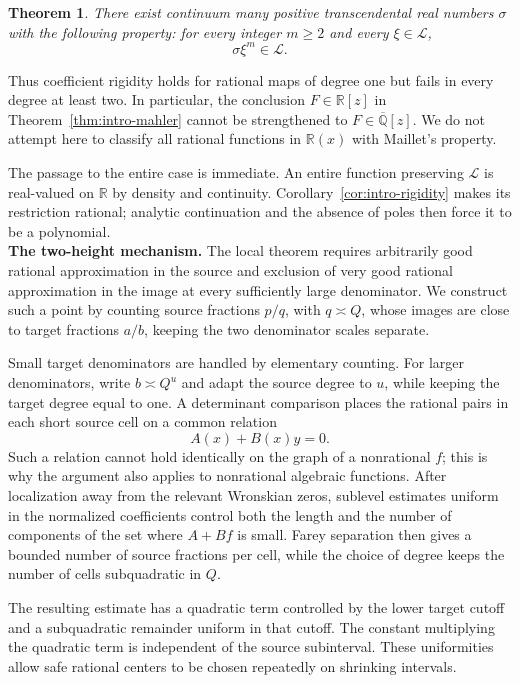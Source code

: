 \documentclass[11pt]{amsart}
\numberwithin{equation}{section}
\newtheorem{theorem}{Theorem}[section]
\theoremstyle{definition}
\theoremstyle{remark}
\newcommand{\R}{\mathbb R}
\newcommand{\Q}{\mathbb Q}
\newcommand{\Lio}{\mathscr L}
\begin{document}
\begin{theorem}\label{thm:intro-nonlinear}
There exist continuum many positive transcendental real numbers $\sigma$
with the following property: for every integer $m\geq2$ and every
$\xi\in\Lio$,
\[
\sigma\xi^m\in\Lio.
\]
\end{theorem}

Thus coefficient rigidity holds for rational maps of degree one but
fails in every degree at least two. In particular, the conclusion
$F\in\R[z]$ in Theorem~\ref{thm:intro-mahler} cannot be strengthened
to $F\in\overline{\Q}[z]$. We do not attempt here to classify all rational functions in $\R(x)$ with Maillet's property.

The passage to the entire case is immediate. An entire function
preserving $\Lio$ is real-valued on $\mathbb R$ by density and
continuity. Corollary~\ref{cor:intro-rigidity} makes its restriction
rational; analytic continuation and the absence of poles then
force it to be a polynomial.\\

\noindent
\textbf{The two-height mechanism.}
The local theorem requires arbitrarily good rational approximation
in the source and exclusion of very good rational approximation
in the image at every sufficiently large denominator. We construct
such a point by counting source fractions $p/q$, with $q\asymp Q$,
whose images are close to target fractions $a/b$, keeping the two
denominator scales separate.

Small target denominators are handled by elementary counting.
For larger denominators, write $b\asymp Q^u$ and adapt the source
degree to $u$, while keeping the target degree equal to one.
A determinant comparison places the rational pairs in each short
source cell on a common relation
\[
A(x)+B(x)y=0.
\]
Such a relation cannot hold identically on the graph of a
nonrational $f$; this is why the argument also applies to
nonrational algebraic functions. After localization away from the
relevant Wronskian zeros, sublevel estimates uniform in the
normalized coefficients control both the length and the number
of components of the set where $A+Bf$ is small. Farey separation
then gives a bounded number of source fractions per cell, while
the choice of degree keeps the number of cells subquadratic
in $Q$.

The resulting estimate has a quadratic term controlled by the
lower target cutoff and a subquadratic remainder uniform in that
cutoff. The constant multiplying the quadratic term is independent
of the source subinterval. These uniformities allow safe rational
centers to be chosen repeatedly on shrinking intervals.
\end{document}
